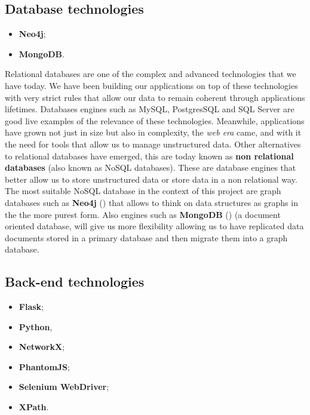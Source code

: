 \subsection{Database technologies}
\begin{itemize}
    \item \textbf{Neo4j};
    \item \textbf{MongoDB}.
\end{itemize}

Relational databases are one of the complex and advanced technologies that we have today. We have been building our applications on top of these technologies with very strict rules that allow our data to remain coherent through applications lifetimes. Databases engines such as MySQL, PostgresSQL and SQL Server are good live examples of the relevance of these technologies. Meanwhile, applications have grown not just in size but also in complexity, the \textit{web era} came, and with it the need for tools that allow us to manage unstructured data. Other alternatives to relational databases have emerged, this are today known as \textbf{non relational databases} (also known as NoSQL databases). These are database engines that better allow us to store unstructured data or store data in a non relational way. The most suitable NoSQL database in the context of this project are graph databases such as \textbf{Neo4j} (\cite{developers2012neo4j}) that allows to think on data structures as graphs in the the more purest form. Also engines such as \textbf{MongoDB} (\cite{mongodb}) (a document oriented database, will give us more flexibility allowing us to have replicated data documents stored in a primary database and then migrate them into a graph database.

\subsection{Back-end technologies}
\begin{itemize}
    \item \textbf{Flask};
    \item \textbf{Python},
    \item \textbf{NetworkX};
    \item \textbf{PhantomJS};
    \item \textbf{Selenium WebDriver};
    \item \textbf{XPath}.
\end{itemize}

